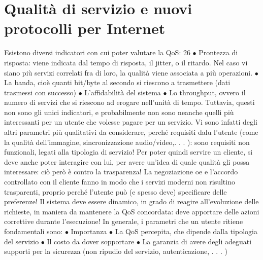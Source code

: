
\section{Qualità di servizio e nuovi protocolli per Internet}
Esistono diversi indicatori con cui poter valutare la QoS:
26
$\bullet$ Prontezza di risposta: viene indicata dal tempo di risposta, il jitter, o il
ritardo. Nel caso vi siano più servizi correlati fra di loro, la qualità viene
associata a più operazioni.
$\bullet$ La banda, cioè quanti bit/byte al secondo si riescono a trasmettere (dati
trasmessi con successo)
$\bullet$ L'affidabilità del sistema
$\bullet$ Lo throughput, ovvero il numero di servizi che si riescono ad erogare
nell'unità di tempo.
Tuttavia, questi non sono gli unici indicatori, e probabilmente non sono neanche
quelli più interessanti per un utente che volesse pagare per un servizio. Vi sono
infatti degli altri parametri più qualitativi da considerare, perché requisiti dalu
l'utente (come la qualità dell'immagine, sincronizzazione audio/video,. . . ): sono
requisiti non funzionali, legati alla tipologia di servizio! Per poter quindi servire
un cliente, si deve anche poter interagire con lui, per avere un'idea di quale
qualità gli possa interessare: ciò però è contro la trasparenza! La negoziazione
oe
e l'accordo controllato con il cliente fanno in modo che i servizi moderni non
risultino trasparenti, proprio perché l'utente può (e spesso deve) specificare delle
preferenze! Il sistema deve essere dinamico, in grado di reagire all'evoluzione
delle richieste, in maniera da mantenere la QoS concordata: deve apportare
delle azioni correttive durante l'esecuzione! In generale, i parametri che un
utente ritiene fondamentali sono:
$\bullet$ Importanza
$\bullet$ La QoS percepita, che dipende dalla tipologia del servizio
$\bullet$ Il costo da dover sopportare
$\bullet$ La garanzia di avere degli adeguati supporti per la sicurezza (non ripudio
del servizio, autenticazione, . . . )

